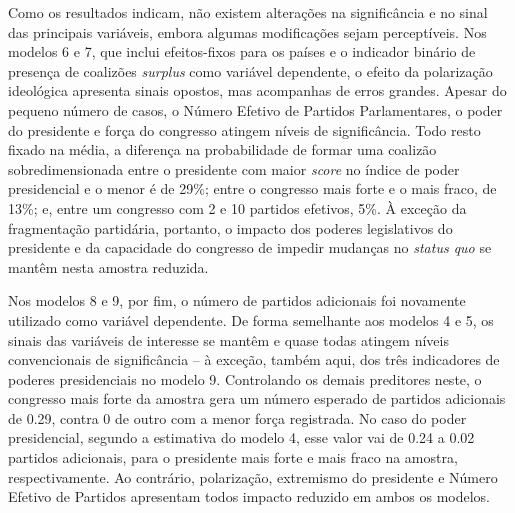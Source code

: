 Como os resultados indicam, não existem alterações na significância e no sinal das principais variáveis, embora algumas modificações sejam perceptíveis. Nos modelos 6 e 7, que inclui efeitos-fixos para os países e o indicador binário de presença de coalizões \textit{surplus} como variável dependente, o efeito da polarização ideológica apresenta sinais opostos, mas acompanhas de erros grandes. Apesar do pequeno número de casos, o Número Efetivo de Partidos Parlamentares, o poder do presidente e força do congresso atingem níveis de significância. Todo resto fixado na média, a diferença na probabilidade de formar uma coalizão sobredimensionada entre o presidente com maior \textit{score} no índice de poder presidencial e o menor é de 29\%; entre o congresso mais forte e o mais fraco, de 13\%; e, entre um congresso com 2 e 10 partidos efetivos, 5\%. À exceção da fragmentação partidária, portanto, o impacto dos poderes legislativos do presidente e da capacidade do congresso de impedir mudanças no \textit{status quo} se mantêm nesta amostra reduzida.
 
Nos modelos 8 e 9, por fim, o número de partidos adicionais foi novamente utilizado como variável dependente. De forma semelhante aos modelos 4 e 5, os sinais das variáveis de interesse se mantêm e quase todas atingem níveis convencionais de significância -- à exceção, também aqui, dos três indicadores de poderes presidenciais no modelo 9. Controlando os demais preditores neste, o congresso mais forte da amostra gera um número esperado de partidos adicionais de 0.29, contra 0 de outro com a menor força registrada. No caso do poder presidencial, segundo a estimativa do modelo 4, esse valor vai de 0.24 a 0.02 partidos adicionais, para o presidente mais forte e mais fraco na amostra, respectivamente. Ao contrário, polarização, extremismo do presidente e Número Efetivo de Partidos apresentam todos impacto reduzido em ambos os modelos.

